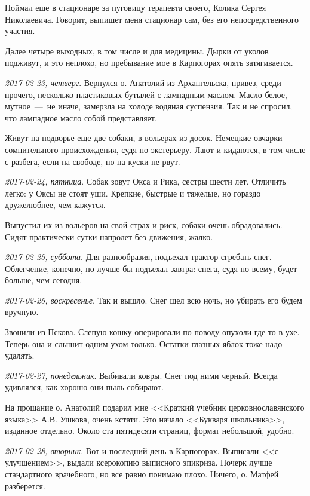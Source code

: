 \documentclass[
    12pt
    ,a4paper
    ,oneside
    ,russian
]{memoir}
\newcommand{\mydatestamp}{
    \bigskip   %
    \emph
}
\newcommand{\mds}{\mydatestamp}
\begin{document}
    Поймал еще в стационаре за пуговицу терапевта своего, Колика Сергея Николаевича. Говорит, выпишет меня стационар сам, без его непосредственного участия.
    
    Далее четыре выходных, в том числе и для медицины. Дырки от уколов подживут, и это неплохо, но пребывание мое в Карпогорах опять затягивается.

    \mds{2017-02-23, четверг}. Вернулся о. Анатолий из Архангельска, привез, среди прочего, несколько пластиковых бутылей с лампадным маслом. Масло белое, мутное~---~не иначе, замерзла на холоде водяная суспензия. Так и не спросил, что лампадное масло собой представляет.
    
    Живут на подворье еще две собаки, в вольерах из досок. Немецкие овчарки сомнительного происхождения, судя по экстерьеру. Лают и кидаются, в том числе с разбега, если на свободе, но на куски не рвут.

    \mds{2017-02-24, пятница}. Собак зовут Окса и Рика, сестры шести лет. Отличить легко: у Оксы не стоят уши. Крепкие, быстрые и тяжелые, но гораздо дружелюбнее, чем кажутся.
    
    Выпустил их из вольеров на свой страх и риск, собаки очень обрадовались. Сидят практически сутки напролет без движения, жалко.

    \mds{2017-02-25, суббота}. Для разнообразия, подъехал трактор сгребать снег. Облегчение, конечно, но лучше бы подъехал завтра: снега, судя по всему, будет больше, чем сегодня.

    \mds{2017-02-26, воскресенье}. Так и вышло. Снег шел всю ночь, но убирать его будем вручную.
    
    Звонили из Пскова. Слепую кошку оперировали по поводу опухоли где-то в ухе. Теперь она и слышит одним ухом только. Остатки глазных яблок тоже надо удалять.

    \mds{2017-02-27, понедельник}. Выбивали ковры. Снег под ними черный. Всегда удивлялся, как хорошо они пыль собирают.
    
    На прощание о. Анатолий подарил мне <<Краткий учебник церковнославянского языка>> А.В. Ушкова, очень кстати. Это начало <<Букваря школьника>>, изданное отдельно. Около ста пятидесяти страниц, формат небольшой, удобно.

    \mds{2017-02-28, вторник}. Вот и последний день в Карпогорах. Выписали <<с улучшением>>, выдали ксерокопию выписного эпикриза. Почерк лучше стандартного врачебного, но все равно понимаю плохо. Ничего, о. Матфей разберется.
    
\end{document}
